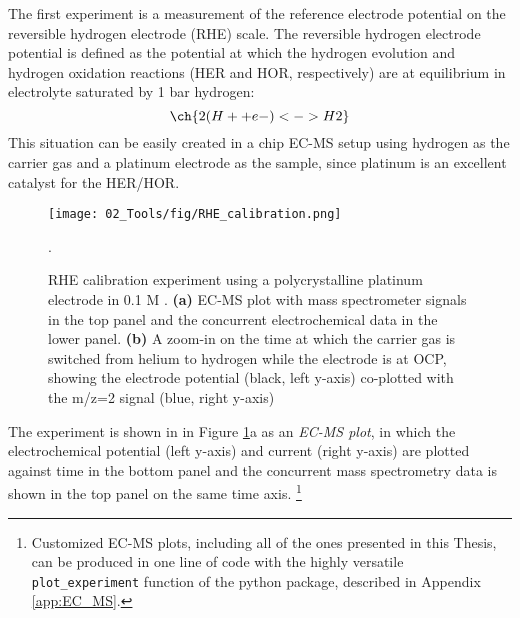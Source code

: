 The first experiment is a measurement of the reference electrode potential on the reversible hydrogen electrode (RHE) scale. The reversible hydrogen electrode potential is defined as the potential at which the hydrogen evolution and hydrogen oxidation reactions (HER and HOR, respectively) are at equilibrium in electrolyte saturated by 1 bar hydrogen:
\begin{equation}
\ch{2 (H+ + e- ) <-> H2} \label{rxn:HER2p1}
\end{equation}
This situation can be easily created in a chip EC-MS setup using hydrogen as the carrier gas and a platinum electrode as the sample, since platinum is an excellent catalyst for the HER/HOR\cite{Nørskov2005a, Kemppainen2015, Tymoczko2016}. 

\begin{figure}[h!]
	\centering
	\texttt{[image: 02\_Tools/fig/RHE\_calibration.png]}
	\caption{RHE calibration experiment using a polycrystalline platinum electrode in 0.1 M . \textbf{(a)} EC-MS plot with mass spectrometer signals in the top panel and the concurrent electrochemical data in the lower panel. \textbf{(b)} A zoom-in on the time at which the carrier gas is switched from helium to hydrogen while the electrode is at OCP, showing the electrode potential (black, left y-axis) co-plotted with the m/z=2 signal (blue, right y-axis)}.
	\label{fig:RHE_cal}
\end{figure}

The experiment is shown in  in Figure \ref{fig:RHE_cal}a as an \textit{EC-MS plot}, in which the electrochemical potential (left y-axis) and current (right y-axis) are plotted against time in the bottom panel and the concurrent mass spectrometry data is shown in the top panel on the same time axis.
\footnote{Customized EC-MS plots, including all of the ones presented in this Thesis, can be produced in one line of code with the highly versatile \texttt{plot\_experiment} function of the  python package, described in Appendix \ref{app:EC_MS}.}

